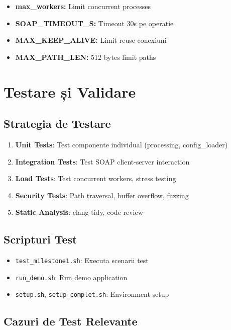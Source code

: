 \documentclass[12pt,a4paper,twoside]{article}
\begin{document}
\begin{itemize}
\begin{itemize}
    \item \textbf{max\_workers:} Limit concurrent processes
    \item \textbf{SOAP\_TIMEOUT\_S:} Timeout 30s pe operație
    \item \textbf{MAX\_KEEP\_ALIVE:} Limit reuse conexiuni
    \item \textbf{MAX\_PATH\_LEN:} 512 bytes limit paths
\end{itemize}

\section{Testare și Validare}

\subsection{Strategia de Testare}

\begin{enumerate}
    \item \textbf{Unit Tests}: Test componente individual (processing, config\_loader)
    \item \textbf{Integration Tests}: Test SOAP client-server interaction
    \item \textbf{Load Tests}: Test concurrent workers, stress testing
    \item \textbf{Security Tests}: Path traversal, buffer overflow, fuzzing
    \item \textbf{Static Analysis}: clang-tidy, code review
\end{enumerate}

\subsection{Scripturi Test}

\begin{itemize}
    \item \texttt{test\_milestone1.sh}: Executa scenarii test
    \item \texttt{run\_demo.sh}: Run demo application
    \item \texttt{setup.sh}, \texttt{setup\_complet.sh}: Environment setup
\end{itemize}

\subsection{Cazuri de Test Relevante}


\end{itemize}
\end{document}
